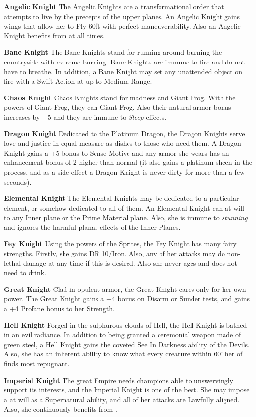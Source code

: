 \begin{itemize*}
\item \textbf{Angelic Knight} The Angelic Knights are a transformational order that attempts to live by the precepts of the upper planes. An Angelic Knight gains wings that allow her to Fly 60ft with perfect maneuverability. Also an Angelic Knight benefits from  at all times.
\item \textbf{Bane Knight} The Bane Knights stand for running around burning the countryside with extreme burning. Bane Knights are immune to fire and do not have to breathe. In addition, a Bane Knight may set any unattended object on fire with a Swift Action at up to Medium Range.
\item \textbf{Chaos Knight} Chaos Knights stand for madness and Giant Frog. With the powers of Giant Frog, they can Giant Frog. Also their natural armor bonus increases by +5 and they are immune to \textit{Sleep} effects.
\item \textbf{Dragon Knight} Dedicated to the Platinum Dragon, the Dragon Knights serve love and justice in equal measure as dishes to those who need them. A Dragon Knight gains a +5 bonus to Sense Motive and any armor she wears has an enhancement bonus of 2 higher than normal (it also gains a platinum sheen in the process, and as a side effect a Dragon Knight is never dirty for more than a few seconds).
\item \textbf{Elemental Knight} The Elemental Knights may be dedicated to a particular element, or somehow dedicated to all of them. An Elemental Knight can  at will to any Inner plane or the Prime Material plane. Also, she is immune to \textit{stunning} and ignores the harmful planar effects of the Inner Planes.
\item \textbf{Fey Knight} Using the powers of the Sprites, the Fey Knight has many fairy strengths. Firstly, she gains DR 10/Iron. Also, any of her attacks may do non-lethal damage at any time if this is desired. Also she never ages and does not need to drink.
\item \textbf{Great Knight} Clad in opulent armor, the Great Knight cares only for her own power. The Great Knight gains a +4 bonus on Disarm or Sunder tests, and gains a +4 Profane bonus to her Strength.
\item \textbf{Hell Knight} Forged in the sulphurous clouds of Hell, the Hell Knight is bathed in an evil radiance. In addition to being granted a ceremonial weapon made of green steel, a Hell Knight gains the coveted See In Darkness ability of the Devils. Also, she has an inherent ability to know what every creature within 60' her of finds most repugnant.
\item \textbf{Imperial Knight} The great Empire needs champions able to unswervingly support its interests, and the Imperial Knight is one of the best. She may impose a  at will as a Supernatural ability, and all of her attacks are Lawfully aligned. Also, she continuously benefits from .
\end{itemize*}
